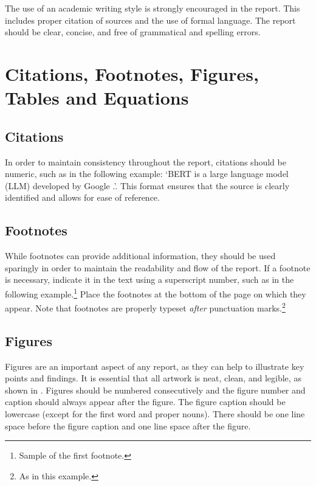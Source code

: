 \documentclass{article}
\begin{document}
The use of an academic writing style is strongly encouraged in the report. This includes proper citation of sources and the use of formal language. The report should be clear, concise, and free of grammatical and spelling errors.



\section{Citations, Footnotes, Figures, Tables and Equations}
\subsection{Citations}

In order to maintain consistency throughout the report, citations should be numeric, such as in the following example: `BERT is a large language model (LLM) developed by Google \cite{Devlin2019BERTPO}.'. This format ensures that the source is clearly identified and allows for ease of reference.


\subsection{Footnotes}

While footnotes can provide additional information, they should be used sparingly in order to maintain the readability and flow of the report. If a footnote is necessary, indicate it in the text using a superscript number, such as in the following example.\footnote{Sample of the first footnote.}
%
Place the footnotes at the bottom of the page on which they appear. Note that footnotes are properly typeset \emph{after} punctuation marks.\footnote{As in this example.}



\subsection{Figures}

Figures are an important aspect of any report, as they can help to illustrate key points and findings. It is essential that all artwork is neat, clean, and legible, as shown in . Figures should be numbered consecutively and the figure number and caption should always appear after the figure. The figure caption should be lowercase (except for the first word and proper nouns). There should be one line space before the figure caption and one line space after the figure.
\end{document}

